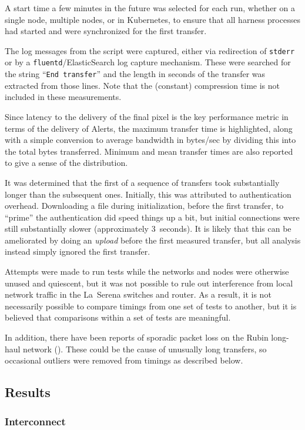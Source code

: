 A start time a few minutes in the future was selected for each run, whether on a single node, multiple nodes, or in Kubernetes, to ensure that all harness processes had started and were synchronized for the first transfer.

The log messages from the script were captured, either via redirection of \texttt{stderr} or by a \texttt{fluentd}/ElasticSearch log capture mechanism.
These were searched for the string ``\texttt{End transfer}'' and the length in seconds of the transfer was extracted from those lines.
Note that the (constant) compression time is not included in these measurements.

Since latency to the delivery of the final pixel is the key performance metric in terms of the delivery of Alerts, the maximum transfer time is highlighted, along with a simple conversion to average bandwidth in bytes/sec by dividing this into the total bytes transferred.
Minimum and mean transfer times are also reported to give a sense of the distribution.

It was determined that the first of a sequence of transfers took substantially longer than the subsequent ones.
Initially, this was attributed to authentication overhead.
Downloading a file during initialization, before the first transfer, to ``prime'' the authentication did speed things up a bit, but initial connections were still substantially slower (approximately 3~seconds).
It is likely that this can be ameliorated by doing an \textit{upload} before the first measured transfer, but all analysis instead simply ignored the first transfer.

Attempts were made to run tests while the networks and nodes were otherwise unused and quiescent, but it was not possible to rule out interference from local network traffic in the La~Serena switches and router.
As a result, it is not necessarily possible to compare timings from one set of tests to another, but it is believed that comparisons within a set of tests are meaningful.

In addition, there have been reports of sporadic packet loss on the Rubin long-haul network ().
These could be the cause of unusually long transfers, so occasional outliers were removed from timings as described below.

\subsection{Results}

\subsubsection{Interconnect}

